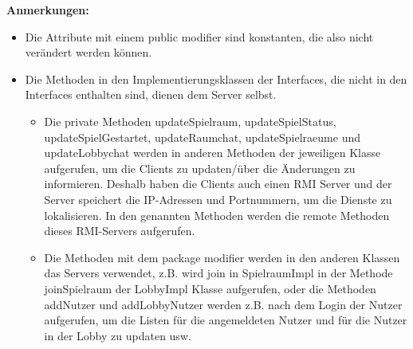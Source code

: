 \textbf{Anmerkungen:}\\ 
\begin{itemize}
    \item Die Attribute mit einem public modifier sind konstanten, die also nicht verändert werden können.
    \item Die Methoden in den Implementierungsklassen der Interfaces, die nicht in den Interfaces enthalten sind, dienen dem Server selbst. 
    \begin{itemize}
    \item Die private Methoden updateSpielraum, updateSpielStatus, updateSpielGestartet, updateRaumchat, updateSpielraeume und updateLobbychat werden in anderen Methoden der jeweiligen Klasse aufgerufen, um die Clients zu updaten/über die Änderungen zu informieren. Deshalb haben die Clients auch einen RMI Server und der Server speichert die IP-Adressen und Portnummern, um die Dienste zu lokalisieren. In den genannten Methoden werden die remote Methoden dieses RMI-Servers aufgerufen.
    \item Die Methoden mit dem package modifier werden in den anderen Klassen das Servers verwendet, z.B. wird join in SpielraumImpl in der Methode joinSpielraum der LobbyImpl Klasse aufgerufen, oder die Methoden addNutzer und addLobbyNutzer werden z.B. nach dem Login der Nutzer aufgerufen, um die Listen für die angemeldeten Nutzer und für die Nutzer in der Lobby zu updaten usw.
    \end{itemize}

\end{itemize}